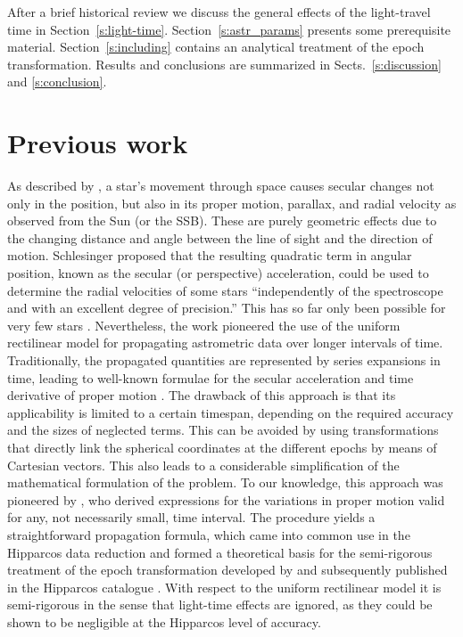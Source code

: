 \documentclass{aa}
\begin{document}
After a brief historical review we discuss the general effects of the light-travel time in
Section~\ref{s:light-time}. Section~\ref{s:astr_params} presents some prerequisite material.
Section~\ref{s:including} contains an analytical treatment of the epoch transformation. Results and conclusions are summarized in Sects.~\ref{s:discussion}
and \ref{s:conclusion}.

\section{Previous work}\label{sec:prev}

As described by \citet{schlesinger1917}, a star's movement through space causes secular
changes not only in the position, but also in its proper motion, parallax, and radial velocity
as observed from the Sun (or the SSB). These are purely geometric effects due to the
changing distance and angle between the line of sight and the direction of motion.
Schlesinger proposed that the resulting quadratic term in angular position, known as the
secular (or perspective) acceleration, could be used to determine the radial velocities
of some stars ``independently of the spectroscope and with an excellent degree of precision.''
This has so far only been possible for very few stars \citep{vanDeKamp1977,dravins+lindegren1999}.
Nevertheless, the work pioneered the use of the uniform rectilinear model for propagating
astrometric data over longer intervals of time.
Traditionally, the propagated quantities are represented by series expansions in time, leading
to well-known formulae for the secular acceleration and time derivative of proper motion
\citep{scott_hughes1964, mueller1969, taff1981, murray1983}. The drawback of this approach
is that its applicability is limited to a certain timespan, depending on the required accuracy
and the sizes of neglected terms. This can be avoided by using transformations that directly
link the spherical coordinates at the different epochs by means of Cartesian vectors. This also
leads to a considerable simplification of the mathematical formulation of the problem. To our
knowledge, this approach was pioneered by \cite{eichhorn_rust1970}, who derived
expressions for the variations in proper motion valid for any, not necessarily small, time interval.
The procedure yields a straightforward propagation formula,
which came into common use in the Hipparcos data reduction \citep{lindegren_et_al1992} and
formed a theoretical basis for the semi-rigorous treatment of the epoch transformation
developed by \citet{lindegren1995b} and subsequently published in the Hipparcos catalogue
\citep[][Vol.~1, Sect.~1.5.5]{esa1997}. With respect to the uniform rectilinear model it is
semi-rigorous in the sense that light-time effects are ignored, as they could be
shown to be negligible at the Hipparcos level of accuracy.
\end{document}
